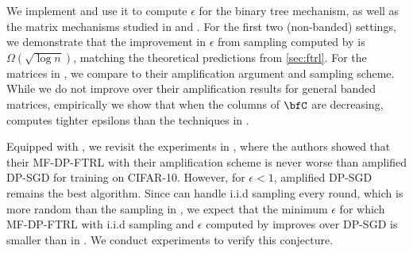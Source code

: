  We implement \MMCC{} and use it to compute $\epsilon$ for the binary tree mechanism, as well as the matrix mechanisms studied in \cite{HU22} and \cite{BandedMF}. For the first two (non-banded) settings, we demonstrate that the improvement in $\epsilon$ from sampling computed by \MMCC{} is $\Omega(\sqrt{\log n})$, matching the theoretical predictions from \cref{sec:ftrl}. For the matrices in \cite{BandedMF}, we compare to their amplification argument and sampling scheme. While we do not improve over their amplification results for general banded matrices, empirically we show that when the columns of $\bfC$ are decreasing, \MMCC{} computes tighter epsilons than the techniques in \cite{BandedMF}.

 Equipped with \MMCC{}, we revisit the experiments in \cite{BandedMF}, where the authors showed that their MF-DP-FTRL with their amplification scheme is never worse than amplified DP-SGD for training on CIFAR-10. However, for $\epsilon < 1$, amplified DP-SGD remains the best algorithm. Since \MMCC{} can handle i.i.d sampling every round, which is more random than the sampling in \cite{BandedMF}, we expect that the minimum $\epsilon$ for which MF-DP-FTRL with i.i.d sampling and $\epsilon$ computed by \MMCC{} improves over DP-SGD is smaller than in \cite{BandedMF}. We conduct experiments to verify this conjecture. 
